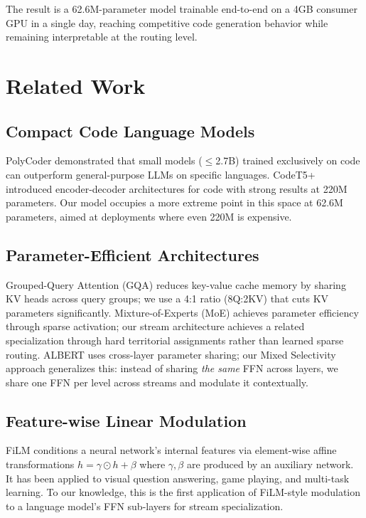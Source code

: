 \documentclass[11pt,a4paper]{article}
\begin{document}
The result is a 62.6M-parameter model trainable end-to-end on a 4GB consumer
GPU in a single day, reaching competitive code generation behavior while
remaining interpretable at the routing level.

\section{Related Work}
\label{sec:related}

\subsection{Compact Code Language Models}

PolyCoder \citep{xu2022systematic} demonstrated that small models ($\leq$2.7B)
trained exclusively on code can outperform general-purpose LLMs on specific
languages.  CodeT5+ \citep{wang2023codet5plus} introduced encoder-decoder
architectures for code with strong results at 220M parameters.  Our model
occupies a more extreme point in this space at 62.6M parameters, aimed at
deployments where even 220M is expensive.

\subsection{Parameter-Efficient Architectures}

Grouped-Query Attention (GQA) \citep{ainslie2023gqa} reduces key-value cache
memory by sharing KV heads across query groups; we use a 4:1 ratio (8Q:2KV)
that cuts KV parameters significantly.  Mixture-of-Experts (MoE)
\citep{shazeer2017outrageously} achieves parameter efficiency through sparse
activation; our stream architecture achieves a related specialization through
hard territorial assignments rather than learned sparse routing.  ALBERT
\citep{lan2019albert} uses cross-layer parameter sharing; our Mixed
Selectivity approach generalizes this: instead of sharing \emph{the same}
FFN across layers, we share one FFN per level across streams and modulate it
contextually.

\subsection{Feature-wise Linear Modulation}

FiLM \citep{perez2018film} conditions a neural network's internal features
via element-wise affine transformations $\hat{h} = \gamma \odot h + \beta$
where $\gamma, \beta$ are produced by an auxiliary network.  It has been
applied to visual question answering, game playing, and multi-task learning.
To our knowledge, this is the first application of FiLM-style modulation to
a language model's FFN sub-layers for stream specialization.
\end{document}
